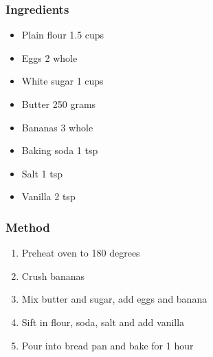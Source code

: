 \documentclass[]{article}
\begin{document}
\subsubsection*{\Large Ingredients}
\begin{multicols}{2}
\begin{itemize}
 \item Plain flour \hfill 1.5 cups
 \item Eggs \hfill 2 whole
 \item White sugar \hfill 1 cups
 \item Butter \hfill 250 grams
 \item Bananas \hfill 3 whole
 \item Baking soda \hfill 1 tsp
 \item Salt \hfill 1 tsp
 \item Vanilla \hfill 2 tsp
\end{itemize}
\end{multicols}
\subsubsection*{\Large Method}
\begin{enumerate}[font=\huge\color{accent}]
	\item Preheat oven to 180 degrees
	\item Crush bananas
	\item Mix butter and sugar, add eggs and banana
	\item Sift in flour, soda, salt and add vanilla
	\item Pour into bread pan and bake for 1 hour
\end{enumerate}
\newpage
{}\label{rec:Orange and Almond Cake}
\end{document}
